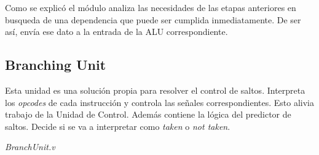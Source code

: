 \documentclass[12pt]{article}
\begin{document}
\noindent Como se explicó el módulo analiza las necesidades de las etapas anteriores en busqueda de una dependencia que puede ser cumplida inmediatamente. De ser así, envía ese dato a la entrada de la ALU correspondiente.

\subsection{Branching Unit}

Esta unidad es una solución propia para resolver el control de saltos. Interpreta los \textit{opcodes} de cada instrucción y controla las señales correspondientes. Esto alivia trabajo de la Unidad de Control. Además contiene la lógica del predictor de saltos. Decide si se va a interpretar como \textit{taken} o \textit{not taken}.

\noindent \textit{BranchUnit.v}
\end{document}
